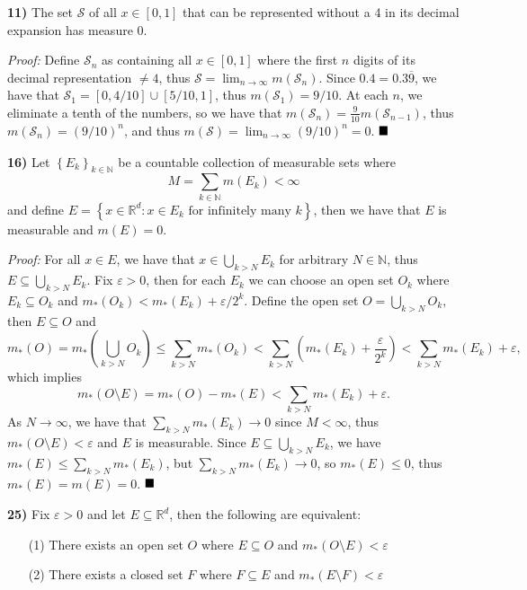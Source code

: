 \documentclass[12pt]{article}
\newcommand{\N}{\mathbb{N}}
\newcommand{\R}{\mathbb{R}}
\newcommand{\e}{\ensuremath{\varepsilon}}
\newcommand{\braceb}[1]{\left\{#1\right\}}
\newcommand{\parenb}[1]{\left(#1\right)}
\newcommand{\proof}{\textit{Proof: }}
\newcommand{\done}{\ensuremath{\strut\hfill\blacksquare}}
\newcommand{\mc}[1]{\ensuremath{\mathcal{#1}}}
\begin{document}
\pagestyle{fancy}

\setlength{\parindent}{0in}
\setlength{\parskip}{0.1in}

\textbf{11)}
The set \mc{S} of all \( x \in [0, 1] \) that can be represented without a 4
in its decimal expansion has measure 0.

\proof
Define \( \mc{S}_n \) as containing all \( x \in [0, 1] \)
where the first \( n \) digits of its decimal representation \( \ne 4 \), thus
\( \mc{S} = \lim_{n \to \infty} m(\mc{S}_n) \).
Since \( 0.4 = 0.3\overline{9} \), we have that
\( \mc{S}_1 = [0, 4/10] \cup [5/10, 1] \), thus \( m(\mc{S}_1) = 9/10 \).
At each \( n \), we eliminate a tenth of the numbers, so we have that
\( m(\mc{S}_n) = \frac{9}{10}m(\mc{S}_{n - 1})\), thus
\( m(\mc{S}_n) = (9/10)^n \), and thus
\( m(\mc{S}) = \lim_{n \to \infty}(9/10)^n = 0 \).
\done

\textbf{16)}
Let \( \braceb{E_k}_{k \in \N} \) be a countable collection of measurable sets
where
\[
	M = \sum_{k \in \N} m(E_k) < \infty
\]
and define
\( E = \braceb{x \in \R^d : x \in E_k \text{ for infinitely many } k} \), then
we have that \( E \) is measurable and \( m(E) = 0 \).

\proof
For all \( x \in E \), we have that \( x \in \bigcup_{k > N} E_k \) for
arbitrary \( N \in \N \), thus \( E \subseteq \bigcup_{k > N} E_k \).
Fix \( \e > 0 \), then for each \( E_k \) we can choose an open set \( O_k \)
where \( E_k \subseteq O_k \) and \( m_*(O_k) < m_*(E_k) + \e / 2^k \).
\cite{PW.Difference}
Define the open set \( O = \bigcup_{k > N} O_k \), then \( E \subseteq O \) and
\[
	m_*(O) = m_*\parenb{\bigcup_{k > N} O_k}
	\leq \sum_{k > N} m_*(O_k)
	< \sum_{k > N} \parenb{m_*(E_k) + \frac{\e}{2^k}}
	< \sum_{k > N} m_*(E_k) + \e,
\]
which implies
\[
	m_*(O \setminus E)
	= m_*(O) - m_*(E)
	< \sum_{k > N} m_*(E_k) + \e.
\]
As \( N \to \infty \), we have that \( \sum_{k > N} m_*(E_k) \to 0 \) since
\( M < \infty \), thus \( m_*(O \setminus E) < \e \) and \( E \) is measurable.
Since \( E \subseteq \bigcup_{k > N} E_k \), we have
\( m_*(E) \leq \sum_{k > N} m_*(E_k) \), but \( \sum_{k > N} m_*(E_k) \to 0 \),
so \( m_*(E) \leq 0 \), thus \( m_*(E) = m(E) = 0 \).
\done

\textbf{25)} Fix \( \e > 0 \) and let \( E \subseteq \R^d \), then the
following are equivalent:
\begin{itemize}
	\item[(1)] There exists an open set \( O \) where \( E \subseteq O \) and
		\( m_*(O \setminus E) < \e \)

	\item[(2)] There exists a closed set \( F \) where \( F \subseteq E \) and
		\( m_*(E \setminus F) < \e \)
\end{itemize}
\end{document}

